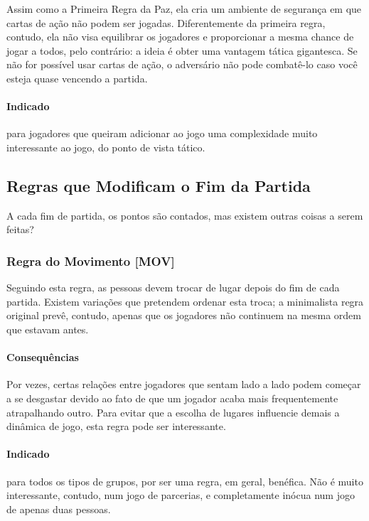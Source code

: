 Assim como a Primeira Regra da Paz, ela cria um ambiente de segurança em que cartas de ação não podem ser jogadas. Diferentemente da primeira regra, contudo, ela não visa equilibrar os jogadores e proporcionar a mesma chance de jogar a todos, pelo contrário: a ideia é obter uma vantagem tática gigantesca. Se não for possível usar cartas de ação, o adversário não pode combatê-lo caso você esteja quase vencendo a partida.

\paragraph{Indicado} 

para jogadores que queiram adicionar ao jogo uma complexidade muito interessante ao jogo, do ponto de vista tático.

\subsection{Regras que Modificam o Fim da Partida}

A cada fim de partida, os pontos são contados, mas existem outras coisas a serem feitas?

\subsubsection{Regra do Movimento [MOV]}

Seguindo esta regra, as pessoas devem trocar de lugar depois do fim de cada partida. Existem variações que pretendem ordenar esta troca; a minimalista regra original prevê, contudo, apenas que os jogadores não continuem na mesma ordem que estavam antes.

\paragraph{Consequências}

Por vezes, certas relações entre jogadores que sentam lado a lado podem começar a se desgastar devido ao fato de que um jogador acaba mais frequentemente atrapalhando outro. Para evitar que a escolha de lugares influencie demais a dinâmica de jogo, esta regra pode ser interessante. 

\paragraph{Indicado} 

para todos os tipos de grupos, por ser uma regra, em geral, benéfica. Não é muito interessante, contudo, num jogo de parcerias, e completamente inócua num jogo de apenas duas pessoas. 

